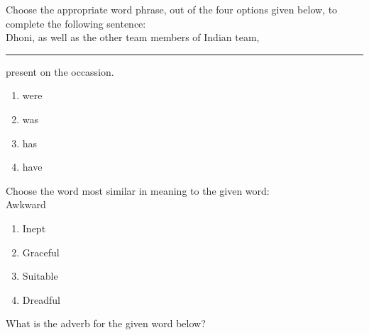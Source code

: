  
\iffalse
\chapter{2015}
\author{Prajwal naik}
\section{me}
\fi












    \item  Choose the appropriate word phrase, out of the four options given below, to complete the following sentence:\\
    Dhoni, as well as the other team members of Indian team,\rule{1cm}{0.15mm} present on the occassion.
    \hfill{}
    \begin{multicols}{4}
        
    
\begin{enumerate}
    \item were 
    \item was
    \item has
    \item have
\end{enumerate}
   \end{multicols}
        
  \item   Choose the word most similar in meaning to the given word:\\Awkward
   \hfill{}
  \begin{multicols}{4}
    \begin{enumerate}
        \item Inept 
        \item Graceful
        \item Suitable
        \item Dreadful
    \end{enumerate}  
  \end{multicols}

 
  
  \item What is the adverb for the given word below?

